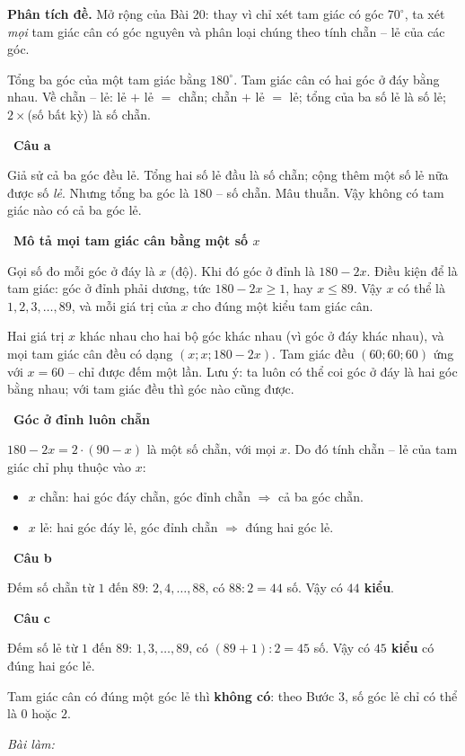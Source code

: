 \documentclass[11pt]{article}
\newif\ifsol \solfalse
\newcommand{\StuProb}[2]{\begin{probboxS}{#1}{#2}\StuProbBody\end{probboxS}}
\newcommand{\probsol}[1]{%
  \begin{lrbox}{\solmeasure}\begin{minipage}{\dimexpr\linewidth-24pt\relax}#1\end{minipage}\end{lrbox}%
  \ifsol
    \begin{solbox}#1\end{solbox}%
  \else
    \setlength{\solht}{\dimexpr\ht\solmeasure+\dp\solmeasure+0.85cm\relax}%
    \ifdim\solht<1.35cm\setlength{\solht}{1.35cm}\fi
    \ifdim\solht>\StudentMaxWork\setlength{\solht}{\StudentMaxWork}\fi
    \par\noindent\begin{minipage}{\linewidth}%
    \expandafter\StuProb\StuProbArgs
    \begin{tcolorbox}[colback=white,colframe=Line,boxrule=0.8pt,arc=5pt,
      left=8pt,right=8pt,top=4pt,bottom=4pt,height=\solht]{\footnotesize\color{Slate}\itshape\WorkWord}\end{tcolorbox}%
    \end{minipage}\par\medskip
  \fi}
\newlength{\StudentMaxWork}\setlength{\StudentMaxWork}{4.5cm}
\newcommand{\step}[2]{\par\smallskip\noindent{\bfseries\color{tmBlue!85!black}\StepWord~#1.}\ {\bfseries #2}\par\nopagebreak}
\def\WorkWord{Bài làm:}
\def\StepWord{Bước}
\begin{document}
\probsol{
\textbf{Phân tích đề.} Mở rộng của Bài 20: thay vì chỉ xét tam giác có góc $70^\circ$, ta xét \emph{mọi} tam giác cân có góc nguyên và phân loại chúng theo tính chẵn -- lẻ của các góc.
\begin{recallbox}Tổng ba góc của một tam giác bằng $180^\circ$. Tam giác cân có hai góc ở đáy bằng nhau. Về chẵn -- lẻ: lẻ $+$ lẻ $=$ chẵn; chẵn $+$ lẻ $=$ lẻ; tổng của ba số lẻ là số lẻ; $2\times$(số bất kỳ) là số chẵn.\end{recallbox}

\step{1}{Câu a}
Giả sử cả ba góc đều lẻ. Tổng hai số lẻ đầu là số chẵn; cộng thêm một số lẻ nữa được số \emph{lẻ}. Nhưng tổng ba góc là $180$ -- số chẵn. Mâu thuẫn. Vậy không có tam giác nào có cả ba góc lẻ.

\step{2}{Mô tả mọi tam giác cân bằng một số $x$}
Gọi số đo mỗi góc ở đáy là $x$ (độ). Khi đó góc ở đỉnh là $180-2x$. Điều kiện để là tam giác: góc ở đỉnh phải dương, tức $180-2x\ge 1$, hay $x\le 89$. Vậy $x$ có thể là $1,2,3,\dots,89$, và mỗi giá trị của $x$ cho đúng một kiểu tam giác cân.
\begin{proofbox}Hai giá trị $x$ khác nhau cho hai bộ góc khác nhau (vì góc ở đáy khác nhau), và mọi tam giác cân đều có dạng $(x;x;180-2x)$. Tam giác đều $(60;60;60)$ ứng với $x=60$ -- chỉ được đếm một lần. Lưu ý: ta luôn có thể coi góc ở đáy là hai góc bằng nhau; với tam giác đều thì góc nào cũng được.\end{proofbox}

\step{3}{Góc ở đỉnh luôn chẵn}
$180-2x=2\cdot(90-x)$ là một số chẵn, với mọi $x$. Do đó tính chẵn -- lẻ của tam giác chỉ phụ thuộc vào $x$:
\begin{itemize}[leftmargin=1.3em,itemsep=1pt]
\item $x$ chẵn: hai góc đáy chẵn, góc đỉnh chẵn $\Rightarrow$ cả ba góc chẵn.
\item $x$ lẻ: hai góc đáy lẻ, góc đỉnh chẵn $\Rightarrow$ đúng hai góc lẻ.
\end{itemize}

\step{4}{Câu b}
Đếm số chẵn từ $1$ đến $89$: $2,4,\dots,88$, có $88:2=44$ số. Vậy có \textbf{$44$ kiểu}.

\step{5}{Câu c}
Đếm số lẻ từ $1$ đến $89$: $1,3,\dots,89$, có $(89+1):2=45$ số. Vậy có \textbf{$45$ kiểu} có đúng hai góc lẻ.\par
Tam giác cân có đúng một góc lẻ thì \textbf{không có}: theo Bước 3, số góc lẻ chỉ có thể là $0$ hoặc $2$.

}
\end{document}
